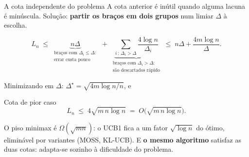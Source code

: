 \documentclass[aspectratio=169, 10pt]{beamer}
\newcommand{\gap}{\Delta}
\newcommand{\Reg}{L}
\begin{document}
\begin{frame}{A cota independente do problema}
  A cota anterior é inútil quando alguma lacuna é minúscula. Solução:
  \textbf{partir os braços em dois grupos} num limiar $\gap$ à escolha.
  \vspace{-0.3em}

  \[
    \Reg_n \;\le\;
      \underbrace{n\gap}_{\substack{\text{braços com } \gap_i \le \gap:\\ \text{errar custa pouco}}}
      \;+\;
      \underbrace{\sum_{i \,:\, \gap_i > \gap} \frac{4\log n}{\gap_i}}_{\substack{\text{braços com } \gap_i > \gap:\\ \text{são descartados rápido}}}
      \;\le\; n\gap + \frac{4m\log n}{\gap}.
  \]

  \vspace{-0.5em}
  Minimizando em $\gap$: $\gap^{\star} = \sqrt{4m\log n / n}$, e

  \begin{teobox}{Cota de pior caso}
    \[
      \Reg_n \;\le\; 4\sqrt{m\,n\log n} \;=\; O\bigl(\sqrt{m\,n\log n}\bigr).
    \]
  \end{teobox}

  \begin{ideiabox}
    O piso minimax é $\Omega(\sqrt{m n})$: o UCB1 fica a um fator
    $\sqrt{\log n}$ do ótimo, eliminável por variantes (MOSS, KL-UCB). E
    \textbf{o mesmo algoritmo} satisfaz as duas cotas: adapta-se sozinho à
    dificuldade do problema.
  \end{ideiabox}
\end{frame}
\end{document}
